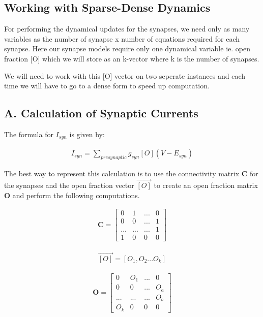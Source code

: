 \documentclass[10pt,letterpaper]{article}
\begin{document}
\subsection*{Working with Sparse-Dense Dynamics}

For performing the dynamical updates for the synapses, we need only as many variables as the number of synapse x number of equations required for each synapse. Here our synapse models require only one dynamical variable ie. open fraction [O] which we will store as an k-vector where k is the number of synapses.

We will need to work with this [O] vector on two seperate instances and each time we will have to go to a dense form to speed up computation.

\subsection*{A. Calculation of Synaptic Currents}

The formula for $I_{syn}$ is given by:

\begin{eqnarray}I_{syn} = \sum_{presynaptic} g_{syn}[O](V-E_{syn})\end{eqnarray}

The best way to represent this calculation is to use the connectivity matrix $\mathbf{C}$ for the synapses and the open fraction vector $\vec{[O]}$ to create an open fraction matrix $\mathbf{O}$ and perform the following computations.

\begin{eqnarray}
\mathbf{C}=
\begin{bmatrix}
0&1&...&0\\
0&0&...&1\\
...&...&...&1\\
1&0&0&0
\end{bmatrix}
\end{eqnarray}

\begin{eqnarray}\vec{[O]}=[O_1,O_2...O_k]\end{eqnarray}

\begin{eqnarray}
\mathbf{O}=
\begin{bmatrix}
0&O_1&...&0\\
0&0&...&O_a\\
...&...&...&O_b\\
O_k&0&0&0
\end{bmatrix}
\end{eqnarray}
\end{document}
